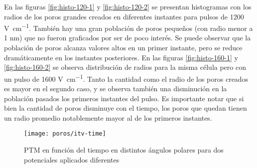 En las figuras \ref{fig:histo-120-1} y \ref{fig:histo-120-2} se presentan histogramas con los radios de los poros grandes creados en diferentes instantes para pulsos de 1200 \si{\volt\per\centi\metre}. También hay una gran población de poros pequeños (con radio menor a 1 \si{\nano\metre}) que no fueron graficados por ser de poco interés. Se puede observar que la población de poros alcanza valores altos en un primer instante, pero se reduce dramáticamente en los instantes posteriores. En las figuras \ref{fig:histo-160-1} y \ref{fig:histo-160-2} se observa distribución de radios para la misma célula pero con un pulso de 1600 \si{\volt\per\centi\metre}. Tanto la cantidad como el radio de los poros creados es mayor en el segundo caso, y se observa también una disminución en la población pasados los primeros instantes del pulso. Es importante notar que si bien la cantidad de poros disminuye con el tiempo, los poros que quedan tienen un radio promedio notablemente mayor al de los primeros instantes.

\begin{figure}
	\texttt{[image: poros/itv-time]}
	\caption{PTM en función del tiempo en distintos ángulos polares para dos potenciales aplicados diferentes}
	\label{fig:itv-time}
\end{figure}



